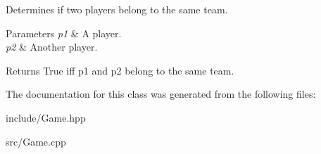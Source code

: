 \-Determines if two players belong to the same team. 


\begin{DoxyParams}{\-Parameters}
{\em p1} & \-A player. \\
\hline
{\em p2} & \-Another player. \\
\hline
\end{DoxyParams}
\begin{DoxyReturn}{\-Returns}
\-True iff p1 and p2 belong to the same team. 
\end{DoxyReturn}


\-The documentation for this class was generated from the following files\-:\begin{DoxyCompactItemize}
\item 
include/\-Game.\-hpp\item 
src/\-Game.\-cpp\end{DoxyCompactItemize}
